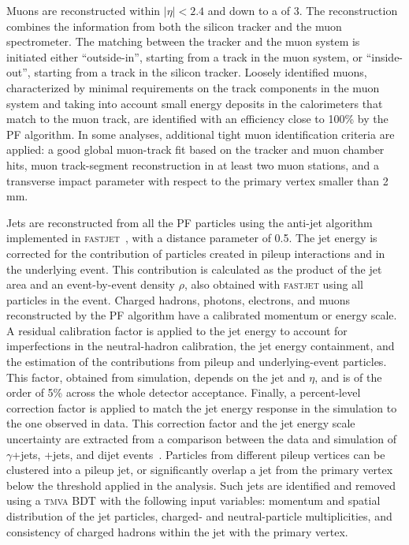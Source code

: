 \documentclass[12pt,twoside,a4paper,cmspaper,final,collab]{cms-tdr}
\begin{document}
Muons are reconstructed within $|\eta| < 2.4$ and down to a \PT of 3\GeV.
The reconstruction combines the information from both the silicon tracker and the
muon spectrometer.
The matching between the tracker and the muon system is initiated either ``outside-in'',
starting from a track in the muon system, or ``inside-out'', starting from a track
in the silicon tracker.
Loosely identified muons, characterized by minimal requirements
on the track components in the muon system and taking into account
small energy deposits in the calorimeters that match to the muon track,
are identified with an efficiency close to 100\% by the PF algorithm.
In some analyses, additional tight muon identification criteria are applied:
a good global muon-track fit based on the tracker and  muon chamber hits,
muon track-segment reconstruction in at least two muon stations,
and a transverse impact parameter with respect to the primary vertex smaller than 2\,mm.


Jets  are reconstructed from all the PF particles using the anti-\kt jet algorithm~\cite{Cacciari:2008gp}
implemented in \textsc{fastjet}~\cite{Cacciari:fastjet}, with a
distance parameter of 0.5.  %
The jet energy is corrected for the contribution of particles created in pileup interactions and in the underlying event.
This contribution is calculated as the product of the jet area and an event-by-event \PT density $\rho$,
also obtained with \textsc{fastjet} using all particles in the event.
Charged hadrons, photons, electrons, and muons reconstructed by the PF algorithm have a calibrated
momentum or energy scale.  A residual calibration factor is applied to
the jet energy to account for imperfections in the
neutral-hadron calibration, the jet energy containment, and the estimation of the contributions from
pileup and underlying-event particles.
This factor, obtained from simulation, depends on the jet \PT and $\eta$, and is of the order of 5\% across the whole detector acceptance.
Finally, a percent-level correction factor is applied to match
the jet energy response in the simulation to the one observed in data.
This correction factor and the jet energy scale uncertainty are extracted from a comparison between the data and
simulation of $\gamma$+jets, \cPZ+jets, and dijet events~\cite{CMS-JME-10-011}.
Particles from different pileup vertices can be clustered into a
pileup jet, or significantly overlap a jet from the primary vertex below the \PT threshold applied in the analysis.
Such jets are identified and removed using a \textsc{tmva} BDT with the following input variables:
momentum and spatial distribution of the jet particles, charged- and neutral-particle multiplicities,
and consistency of charged hadrons within the jet with the primary vertex.
\end{document}
